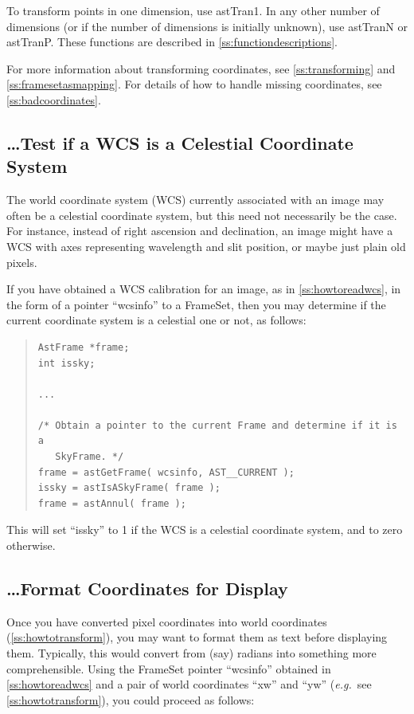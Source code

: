 \documentclass[twoside,11pt]{article}
\newcommand{\htmlref}[2]{#1}
\newcommand{\appref}[1]{Appendix~\ref{#1}}
\newcommand{\secref}[1]{\S\ref{#1}}
\renewcommand{\appref}[1]{\ref{#1}}
\renewcommand{\secref}[1]{\ref{#1}}
\begin{document}
To transform points in one dimension, use \htmlref{astTran1}{astTran1}. In any other
number of dimensions (or if the number of dimensions is initially
unknown), use \htmlref{astTranN}{astTranN} or \htmlref{astTranP}{astTranP}. These functions are described in
\appref{ss:functiondescriptions}.

For more information about transforming coordinates, see
\secref{ss:transforming} and \secref{ss:framesetasmapping}. For
details of how to handle missing coordinates, see
\secref{ss:badcoordinates}.

\subsection{\label{ss:howtotestforcelestial}\ldots Test if a WCS is a Celestial Coordinate System}

The world coordinate system (WCS) currently associated with an image
may often be a celestial coordinate system, but this need not
necessarily be the case. For instance, instead of right ascension and
declination, an image might have a WCS with axes representing
wavelength and slit position, or maybe just plain old pixels.

If you have obtained a WCS calibration for an image, as in
\secref{ss:howtoreadwcs}, in the form of a pointer ``wcsinfo'' to a
\htmlref{FrameSet}{FrameSet}, then you may determine if the current coordinate system is a
celestial one or not, as follows:

\begin{quote}
\small
\begin{verbatim}
AstFrame *frame;
int issky;

...

/* Obtain a pointer to the current Frame and determine if it is a
   SkyFrame. */
frame = astGetFrame( wcsinfo, AST__CURRENT );
issky = astIsASkyFrame( frame );
frame = astAnnul( frame );
\end{verbatim}
\normalsize
\end{quote}

This will set ``issky'' to 1 if the WCS is a celestial coordinate
system, and to zero otherwise.

\subsection{\label{ss:howtoformatcoordinates}\ldots Format Coordinates for Display}

Once you have converted pixel coordinates into world coordinates
(\secref{ss:howtotransform}), you may want to format them as text
before displaying them. Typically, this would convert from (say)
radians into something more comprehensible. Using the \htmlref{FrameSet}{FrameSet} pointer
``wcsinfo'' obtained in \secref{ss:howtoreadwcs} and a pair of world
coordinates ``xw'' and ``yw'' ({\em{e.g.}}\ see
\secref{ss:howtotransform}), you could proceed as follows:
\end{document}
